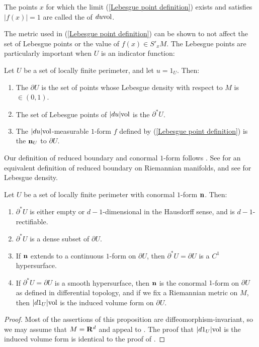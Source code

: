 \begin{definition}
The points $x$ for which the limit (\ref{Lebesgue point definition}) exists and satisfies $|f(x)| = 1$ are called the  of $du\mathrm{vol}$.
\end{definition}

The metric used in (\ref{Lebesgue point definition}) can be shown to not affect the set of Lebesgue points or the value of $f(x) \in S'_xM$.
The Lebesgue points are particularly important when $U$ is an indicator function:

\begin{definition}
Let $U$ be a set of locally finite perimeter, and let $u = 1_U$. Then:
\begin{enumerate}
\item The  $\partial U$ is the set of points whose Lebesgue density with respect to $M$ is $\in (0, 1)$.
\item The set of Lebesgue points of $|du|\mathrm{vol}$ is the  $\partial^* U$.
\item The $|du|\mathrm{vol}$-measurable $1$-form $f$ defined by (\ref{Lebesgue point definition}) is the  $\mathbf n_U$ to $\partial U$.
\end{enumerate}
\end{definition}

Our definition of reduced boundary and conormal $1$-form follows \cite[Definition 3.3]{Giusti77}.
See \cite{Battista_2021} for an equivalent definition of reduced boundary on Riemannian manifolds, and see \cite[Chapter 6]{Pugh02} for Lebesgue density.

\begin{proposition}\label{locality of Caccioppoli}
    Let $U$ be a set of locally finite perimeter with conormal $1$-form $\mathbf n$.
    Then:
    \begin{enumerate}
    \item $\partial^* U$ is either empty or $d-1$-dimensional in the Hausdorff sense, and is $d-1$-rectifiable.
    \item $\partial^* U$ is a dense subset of $\partial U$.
    \item If $\mathbf n$ extends to a continuous $1$-form on $\partial U$, then $\partial^* U = \partial U$ is a $C^1$ hypersurface.
    \item If $\partial^* U = \partial U$ is a smooth hypersurface, then $\mathbf n$ is the conormal $1$-form on $\partial U$ as defined in differential topology, and if we fix a Riemannian metric on $M$, then $|d1_U|\mathrm{vol}$ is the induced volume form on $\partial U$.
\end{enumerate}
\end{proposition}
\begin{proof}
Most of the assertions of this proposition are diffeomorphism-invariant, so we may assume that $M = \mathbf{R}^d$ and appeal to \cite[Chapters 2-4]{Giusti77}.
The proof that $|d1_U|\mathrm{vol}$ is the induced volume form is identical to the proof of \cite[Example 1.4]{Giusti77}.
\end{proof}

